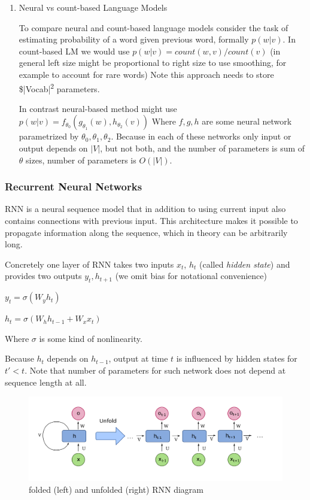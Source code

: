\documentclass[11pt]{report}
\begin{document}
\begin{enumerate}
\item Neural vs count-based Language Models


To compare neural and count-based language models consider the task of estimating probability of a word given previous word, formally \(p(w|v)\).
In count-based LM we would use \(p(w|v) = count(w,v)/count(v)\) (in general left size might be proportional to right size to use smoothing, for example to account for rare words)
Note this approach needs to store \$|Vocab|\textsuperscript{2} parameters.

In contrast neural-based method might use \(p(w|v) = f_{\theta_0}(g_{\theta_1}(w), h_{\theta_2}(v))\)
Where \(f, g, h\) are some neural network parametrized by \(\theta_0, \theta_1, \theta_2\).
Because in each of these networks only input or output depends on \(|V|\), but not both, and the number of parameters is sum of \(\theta\) sizes, number of parameters is \(O(|V|)\).
\end{enumerate}

\subsubsection{Recurrent Neural Networks}


RNN is a neural sequence model that in addition to using current input also contains connections with previous input.
This architecture makes it possible to propagate information along the sequence, which in theory can be arbitrarily long.

Concretely one layer of RNN takes two inputs \(x_t\), \(h_t\) (called \emph{hidden state}) and provides two outputs \(y_t, h_{t+1}\) (we omit bias for notational convenience)

\(y_t = \sigma(W_y h_t)\)

\(h_t = \sigma(W_h h_{t-1} + W_x x_t)\)

Where \(\sigma\) is some kind of nonlinearity.

Because \(h_t\) depends on \(h_{t-1}\), output at time \(t\) is influenced by hidden states for \(t' < t\).
Note that number of parameters for such network does not depend at sequence length at all.

\begin{figure}[htbp]
\centering
\includegraphics[width=.9\linewidth]{./img/RNN.png}
\caption{folded (left) and unfolded (right) RNN diagram}
\end{figure}
\end{document}
